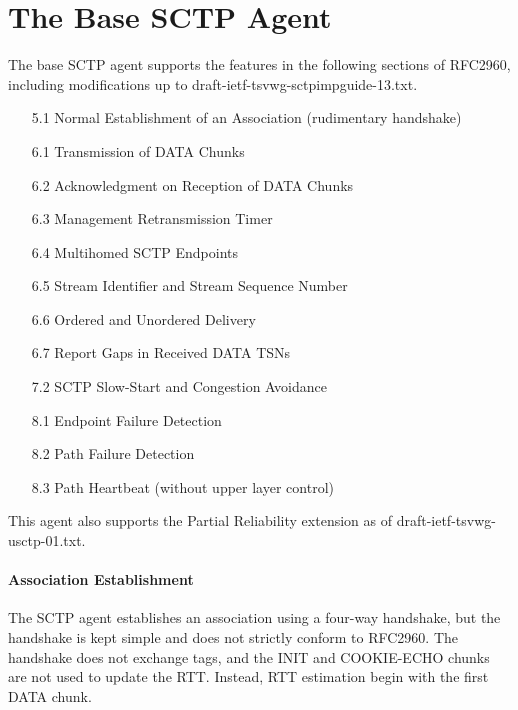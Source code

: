    \section{The Base SCTP Agent}
   \label{sec:baseSctp}

      The base SCTP agent  supports the features in the
      following sections of RFC2960, including modifications up to
      draft-ietf-tsvwg-sctpimpguide-13.txt.

      \begin{itemize}\itemsep0pt

	 \item[5.1] Normal Establishment of an Association (rudimentary
	 handshake)

	 \item[6.1] Transmission of DATA Chunks

	 \item[6.2] Acknowledgment on Reception of DATA Chunks

	 \item[6.3] Management Retransmission Timer

	 \item[6.4] Multihomed SCTP Endpoints

	 \item[6.5] Stream Identifier and Stream Sequence Number

	 \item[6.6] Ordered and Unordered Delivery 

	 \item[6.7] Report Gaps in Received DATA TSNs

	 \item[7.2] SCTP Slow-Start and Congestion Avoidance

	 \item[8.1] Endpoint Failure Detection

	 \item[8.2] Path Failure Detection

	 \item[8.3] Path Heartbeat (without upper layer control)

      \end{itemize}

      This agent also supports the Partial Reliability extension as of
      draft-ietf-tsvwg-usctp-01.txt.

      \paragraph{Association Establishment} The SCTP agent establishes an
      association using a four-way handshake, but the handshake is kept
      simple and does not strictly conform to RFC2960. The handshake does
      not exchange tags, and the INIT and COOKIE-ECHO chunks are not used
      to update the RTT.  Instead, RTT estimation begin with the first
      DATA chunk.

